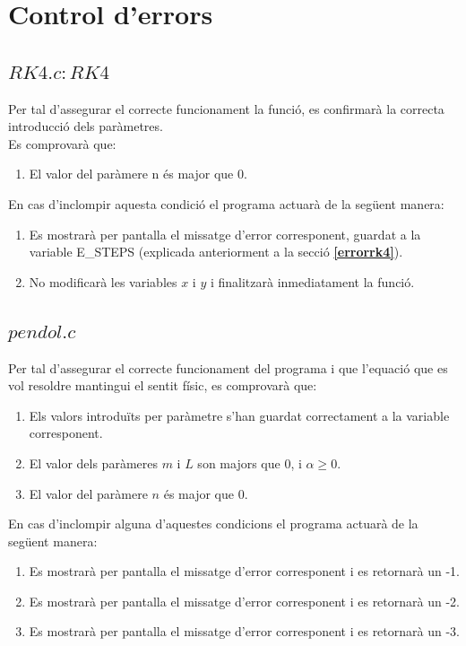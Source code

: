 \documentclass[a4paper, 11pt]{article}
\begin{document}
\section{Control d'errors}
\subsection{$RK4.c: RK4$}
Per tal d'assegurar el correcte funcionament la funció, es confirmarà la correcta introducció dels paràmetres.\\
Es comprovarà que:
\begin{enumerate}
    \item El valor del paràmere n és major que $0$.
\end{enumerate}
En cas d'inclompir aquesta condició el programa actuarà de la següent manera:
\begin{enumerate}
    \item Es mostrarà per pantalla el missatge d'error corresponent, guardat a la variable \textcolor{Dandelion}{E\_STEPS} (explicada anteriorment a la secció \textcolor{blue}{\textbf{\ref{errorrk4}}}).
    \item No modificarà les variables $x$ i $y$ i finalitzarà inmediatament la funció.
\end{enumerate}

\subsection{$pendol.c$}
Per tal d'assegurar el correcte funcionament del programa i que l'equació que es vol resoldre mantingui el sentit físic, es comprovarà que:
\begin{enumerate}
    \item Els valors introduïts per paràmetre s'han guardat correctament a la variable corresponent.
    \item El valor dels paràmeres $m$ i $L$ son majors que $0$, i $\alpha \geq 0$.
    \item El valor del paràmere $n$ és major que $0$.
\end{enumerate}
En cas d'inclompir alguna d'aquestes condicions el programa actuarà de la següent manera:
\begin{enumerate}
    \item Es mostrarà per pantalla el missatge d'error corresponent i es retornarà un -1.
    \item Es mostrarà per pantalla el missatge d'error corresponent i es retornarà un -2.
    \item Es mostrarà per pantalla el missatge d'error corresponent i es retornarà un -3.
\end{enumerate}
\end{document}
